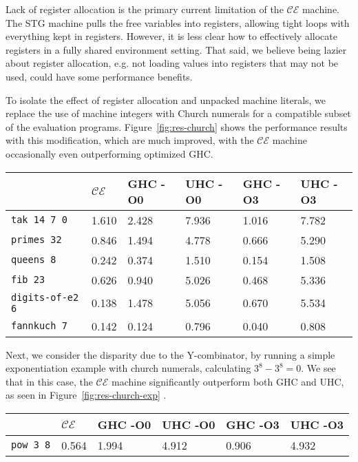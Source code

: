 Lack of register allocation is the primary current limitation of the $\mathcal{CE}$
machine. The STG machine pulls the free variables into registers, allowing tight
loops with everything kept in registers. However, it is less clear how to
effectively allocate registers in a fully shared environment setting.
That said, we believe being lazier about register allocation, e.g. not loading
values into registers that may not be used, could have some performance benefits.

To isolate the effect of register allocation and unpacked machine
literals, we replace the use of machine integers with Church numerals for a
compatible subset of the evaluation programs. Figure~\ref{fig:res-church}
shows the performance results with this modification, which are much improved,
with the $\mathcal{CE}$ machine occasionally even outperforming optimized GHC.

\begin{figure*}
\centering
\begin{tabularx}{\textwidth}{l | X | X | X | X | X}
& $\mathcal{CE}$ & GHC -O0 & UHC -O0 & GHC -O3 & UHC -O3 \\
\hline
\texttt{tak 14 7 0} & 1.610 & 2.428 & 7.936 & 1.016 & 7.782 \\
\texttt{primes 32} & 0.846 & 1.494 & 4.778 & 0.666 & 5.290 \\
\texttt{queens 8} & 0.242 & 0.374 & 1.510 & 0.154 & 1.508 \\
\texttt{fib 23} & 0.626 & 0.940 & 5.026 & 0.468 & 5.336 \\
\texttt{digits-of-e2 6} & 0.138 & 1.478 & 5.056 & 0.670 & 5.534 \\
\texttt{fannkuch 7} & 0.142 & 0.124 & 0.796 & 0.040 & 0.808 \\
\end{tabularx}
\caption{Church Numeral Benchmark Results. Measurement is wall clock time, 
units are seconds. Times averaged over 5 runs.}
\label{fig:res-church}
\end{figure*}

Next, we consider the disparity due to the Y-combinator, by running a simple
exponentiation example with church numerals, calculating $3^8 - 3^8 = 0$. We see
that in this case, the $\mathcal{CE}$ machine significantly outperform both GHC
and UHC, as seen in Figure~\ref{fig:res-church-exp} .

\begin{figure*}
\begin{tabularx}{\textwidth}{l | X | X | X | X | X}
& $\mathcal{CE}$ & GHC -O0 & UHC -O0 & GHC -O3 & UHC -O3 \\
\hline
\texttt{pow 3 8} & 0.564 & 1.994 & 4.912 & 0.906 & 4.932 \\
\end{tabularx}
\caption{Church Numeral Exponentiation Benchmark Results. Measurement is wall clock time, 
units are seconds. Times averaged over 5 runs}
\label{fig:res-church-exp}
\end{figure*}

